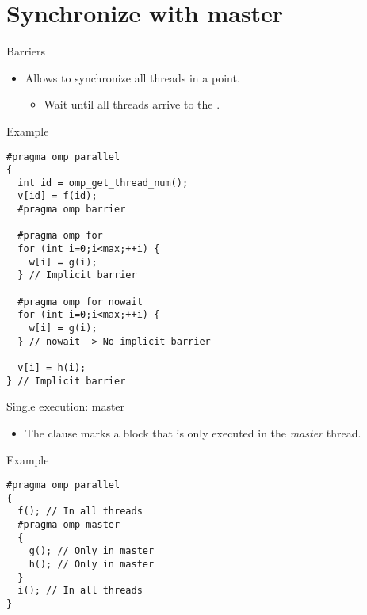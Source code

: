 \section{Synchronize with master}

\begin{frame}[t,fragile]{Barriers}
\begin{itemize}
  \item Allows to synchronize all threads in a point.
    \begin{itemize}
      \item Wait until all threads arrive to the .
    \end{itemize}
\end{itemize}
\begin{block}{Example}
\begin{lstlisting}[basicstyle=\tiny]
#pragma omp parallel
{
  int id = omp_get_thread_num();
  v[id] = f(id);
  #pragma omp barrier

  #pragma omp for
  for (int i=0;i<max;++i) {
    w[i] = g(i);
  } // Implicit barrier

  #pragma omp for nowait
  for (int i=0;i<max;++i) {
    w[i] = g(i);
  } // nowait -> No implicit barrier

  v[i] = h(i);
} // Implicit barrier
\end{lstlisting}
\end{block}
\end{frame}

\begin{frame}[t,fragile]{Single execution: master}
\begin{itemize}
  \item The  clause marks a block that is only
        executed in the \emph{master} thread.
\end{itemize}
\begin{block}{Example}
\begin{lstlisting}
#pragma omp parallel
{
  f(); // In all threads
  #pragma omp master
  {
    g(); // Only in master
    h(); // Only in master
  }
  i(); // In all threads
}
\end{lstlisting}
\end{block}
\end{frame}


